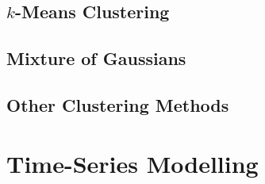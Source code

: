 \documentclass{report}
\begin{document}
\subsection{$k$-Means Clustering}

\subsection{Mixture of Gaussians}

\subsection{Other Clustering Methods}

\section{Time-Series Modelling}
\label{sec:timeseries}












\end{document}
